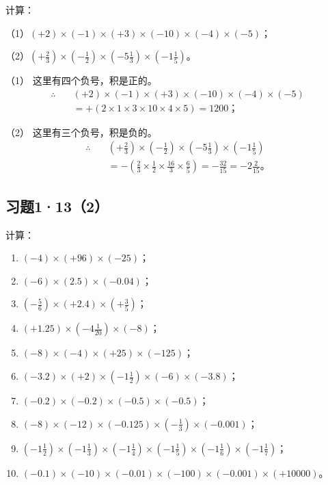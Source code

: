  计算：
\par\smallskip
（1）\((+2) \times (-1) \times (+3) \times (-10) \times (-4) \times (-5)\)；
\par\smallskip
（2）\(\left(+\frac{2}{3}\right) \times \left(-\frac{1}{2}\right) \times \left(-5\frac{1}{3}\right) \times \left(-1\frac{1}{5}\right)\)。

 （1） 这里有四个负号，积是正的。
\begin{align*}
\therefore\quad & (+2) \times (-1) \times (+3) \times (-10) \times (-4) \times (-5) \\
&= +(2 \times 1 \times 3 \times 10 \times 4 \times 5) = 1200；
\end{align*}

（2） 这里有三个负号，积是负的。
\begin{align*}
\therefore\quad & \left(+\frac{2}{3}\right) \times \left(-\frac{1}{2}\right) \times \left(-5\frac{1}{3}\right) \times \left(-1\frac{1}{5}\right) \\
&= -\left(\frac{2}{3} \times \frac{1}{2} \times \frac{16}{3} \times \frac{6}{5}\right) = -\frac{32}{15} = -2\frac{2}{15}。
\end{align*}

\subsection{习题1·13（2）}

计算：

\begin{enumerate}
\item \((-4) \times (+96) \times (-25)\)；
\item \((-6) \times (2.5) \times (-0.04)\)；
\item \(\left(-\frac{5}{6}\right) \times (+2.4) \times \left(+\frac{3}{5}\right)\)；
\item \((+1.25) \times \left(-4\frac{1}{20}\right) \times (-8)\)；
\item \((-8) \times (-4) \times (+25) \times (-125)\)；
\item \((-3.2) \times (+2) \times \left(-1\frac{1}{2}\right) \times (-6) \times (-3.8)\)；
\item \((-0.2) \times (-0.2) \times (-0.5) \times (-0.5)\)；
\item \((-8) \times (-12) \times (-0.125) \times \left(-\frac{1}{3}\right) \times (-0.001)\)；
\item \(\left(-1\frac{1}{2}\right) \times \left(-1\frac{1}{3}\right) \times \left(-1\frac{1}{4}\right) \times \left(-1\frac{1}{5}\right) \times \left(-1\frac{1}{6}\right) \times \left(-1\frac{1}{7}\right)\)；
\item \((-0.1) \times (-10) \times (-0.01) \times (-100) \times (-0.001) \times (+10000)\)。
\end{enumerate}

